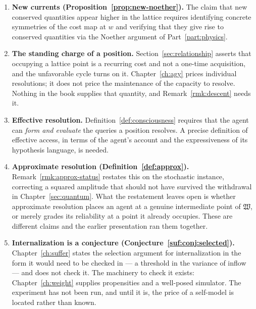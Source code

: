 \begin{enumerate}[label=\textbf{Gap \arabic*.}, leftmargin=*, itemsep=8pt]
  \item \textbf{New currents (Proposition~\ref{prop:new-noether}).}
        The claim that new conserved quantities appear higher in the
        lattice requires identifying concrete symmetries of the cost map
        at $w$ and verifying that they give rise to conserved quantities
        via the Noether argument of Part~\ref{part:physics}.

  \item \textbf{The standing charge of a position.}
        Section~\ref{sec:relationship} asserts that occupying a lattice
        point is a recurring cost and not a one-time acquisition, and the
        unfavorable cycle turns on it.
        Chapter~\ref{ch:agy} prices individual resolutions; it does not
        price the maintenance of the capacity to resolve.
        Nothing in the book supplies that quantity, and
        Remark~\ref{rmk:descent} needs it.

  \item \textbf{Effective resolution.}
        Definition~\ref{def:consciousness} requires that the agent can
        \emph{form and evaluate} the queries a position resolves.
        A precise definition of effective access, in terms of the agent's
        account and the expressiveness of its hypothesis language, is
        needed.

  \item \textbf{Approximate resolution
        (Definition~\ref{def:approx}).}
        Remark~\ref{rmk:approx-status} restates this on the stochastic
        instance, correcting a squared amplitude that should not have
        survived the withdrawal in Chapter~\ref{sec:quantum}.
        What the restatement leaves open is whether approximate
        resolution places an agent at a genuine intermediate point of
        $\mathfrak{W}$, or merely grades its reliability at a point it
        already occupies.
        These are different claims and the earlier presentation ran them
        together.

  \item \textbf{Internalization is a conjecture
        (Conjecture~\ref{suf:conj:selected}).}
        Chapter~\ref{ch:suffer} states the selection argument for
        internalization in the form it would need to be checked in ---
        a threshold in the variance of inflow --- and does not check it.
        The machinery to check it exists: Chapter~\ref{ch:weight}
        supplies propensities and a well-posed simulator.
        The experiment has not been run, and until it is, the price of a
        self-model is located rather than known.


\end{enumerate}
